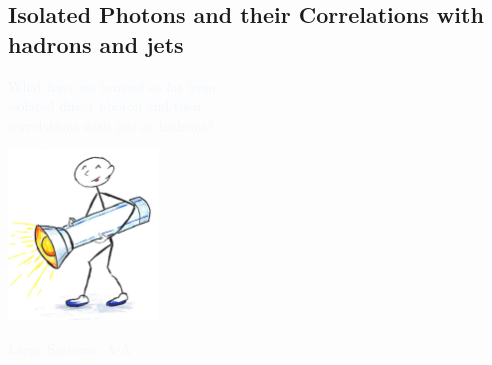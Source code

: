 \documentclass[aspectratio=169,10pt]{beamer}
\begin{document}
% 
%   


\subsection{Isolated Photons and their Correlations with hadrons and jets}
  \begin{frame}{}
     \begin{center}
        \textcolor{AliceBlue}{\hspace{-4cm}\Huge What have we learned so far from \\ \vspace{0.1cm}
        \hspace{-2.8cm} isolated direct photon and their \\ \vspace{0.1cm} correlations with jets or hadrons?} 
     \end{center}
     \vspace{-0.1cm}
     \hspace{10.5cm}\includegraphics[width=0.3\textwidth]{general/flashlight.png}
     \vspace{-1cm}
     \begin{center}
        \textcolor{AliceBlue}{\hspace{-2cm} \Large Large Systems: A-A}
     \end{center}
  \end{frame}
  
\end{document}
